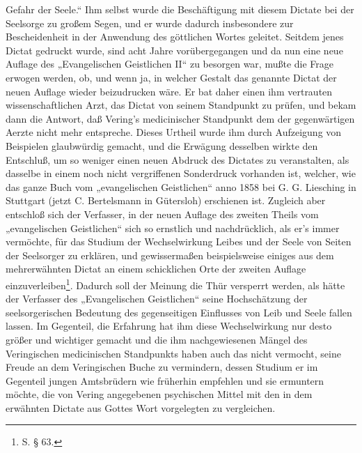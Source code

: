 Gefahr der Seele.“ Ihm selbst wurde die Beschäftigung mit diesem Dictate bei der Seelsorge zu großem Segen, und er wurde dadurch insbesondere zur Bescheidenheit in der Anwendung des göttlichen Wortes geleitet. Seitdem jenes Dictat gedruckt wurde, sind acht Jahre vorübergegangen und da nun eine neue Auflage des „Evangelischen Geistlichen II“ zu besorgen war, mußte die Frage erwogen werden, ob, und wenn ja, in welcher Gestalt das genannte Dictat der neuen Auflage wieder beizudrucken wäre. Er bat daher einen ihm vertrauten wissenschaftlichen Arzt, das Dictat von seinem Standpunkt zu prüfen, und bekam dann die Antwort, daß Vering’s medicinischer Standpunkt dem der gegenwärtigen Aerzte nicht mehr entspreche. Dieses Urtheil wurde ihm durch Aufzeigung von Beispielen glaubwürdig gemacht, und die Erwägung desselben wirkte den Entschluß, um so weniger einen neuen Abdruck des Dictates zu veranstalten, als dasselbe in einem noch nicht vergriffenen Sonderdruck vorhanden ist, welcher, wie das ganze Buch vom „evangelischen Geistlichen“ anno 1858 bei G. G. Liesching in Stuttgart (jetzt C. Bertelsmann in Gütersloh) erschienen ist. Zugleich aber entschloß sich der Verfasser, in der neuen Auflage des zweiten Theils vom „evangelischen Geistlichen“ sich so ernstlich und nachdrücklich, als er’s immer vermöchte, für das Studium der Wechselwirkung Leibes und der Seele von Seiten der Seelsorger zu erklären, und gewissermaßen beispielsweise einiges aus dem mehrerwähnten Dictat an einem schicklichen Orte der zweiten Auflage einzuverleiben\footnote{S. § 63.}. Dadurch
soll der Meinung die Thür versperrt werden, als hätte der Verfasser des „Evangelischen Geistlichen“ seine Hochschätzung der seelsorgerischen Bedeutung des gegenseitigen Einflusses von Leib und Seele fallen lassen. Im Gegenteil, die Erfahrung hat ihm diese Wechselwirkung nur desto größer und wichtiger gemacht und die ihm nachgewiesenen Mängel des Veringischen medicinischen Standpunkts haben auch das nicht vermocht, seine Freude an dem Veringischen Buche zu vermindern, dessen Studium er im Gegenteil jungen Amtsbrüdern wie früherhin empfehlen und sie ermuntern möchte, die von Vering angegebenen psychischen Mittel mit den in dem erwähnten Dictate aus Gottes Wort vorgelegten zu vergleichen.

